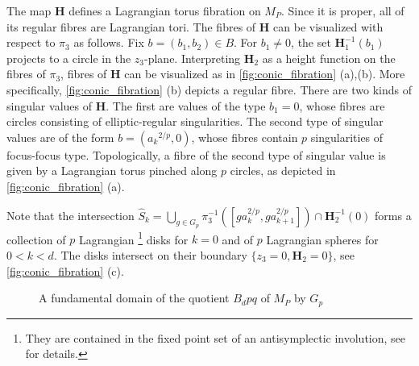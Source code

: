 \documentclass[12pt,a4paper,draft]{scrartcl}
\begin{document}
The map $\mathbf{H}$ defines a Lagrangian torus fibration on $M_P$. Since it is proper, all of its regular fibres are Lagrangian tori. The fibres of $\mathbf{H}$ can be visualized with respect to $π_3$ as follows. Fix $b = (b_1,b_2) ∈ B$. For $b_1 ≠ 0$, the set $\symbf{H}_1^{-1}(b_1)$ projects to a circle in the $z_3$-plane. Interpreting $\symbf{H}_2$ as a height function on the fibres of $π_3$, fibres of $\mathbf{H}$ can be visualized as in \cref{fig:conic_fibration} (a),(b). More specifically, \cref{fig:conic_fibration} (b) depicts a regular fibre. There are two kinds of singular values of $\symbf{H}$. The first are values of the type $b_1 = 0$, whose fibres are circles consisting of elliptic-regular singularities. The second type of singular values are of the form $b = ({a_k}^{2/p},0)$, whose fibres contain $p$ singularities of focus-focus type. Topologically, a fibre of the second type of singular value is given by a Lagrangian torus pinched along $p$ circles, as depicted in \cref{fig:conic_fibration} (a). 

Note that the intersection $\hat{S}_k = ⋃_{g ∈ G_p} π_3^{-1}([g a_k^{2/p},g a_{k+1}^{2/p}]) ∩ \symbf{H}_2^{-1}(0)$ forms a collection of $p$ Lagrangian
\footnote{They are contained in the fixed point set of an antisymplectic involution, see \cite[Remark 7.10]{evans2021atfs} for details.}
disks for $k=0$ and of $p$ Lagrangian spheres for $0<k<d$. The disks intersect on their boundary $\{z_3=0,\symbf{H}_2=0\}$, see \cref{fig:conic_fibration} (c).

\begin{figure}
  \centering
  \caption{A fundamental domain of the quotient $B_dpq$ of $M_P$ by $G_p$}
  \label{fig:conic_fibration_fundamental_domain}
\end{figure}
\end{document}
